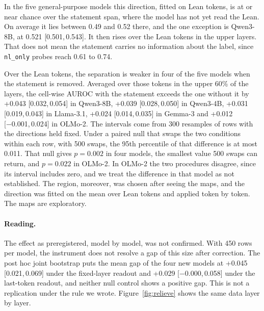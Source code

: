 \documentclass[10pt]{article}
\newcommand{\vr}[1]{\texttt{#1}}
\newcommand{\ic}[2]{[#1,\,#2]}
\begin{document}
In the five general-purpose models this direction, fitted on Lean tokens, is at or near chance over the statement
span, where the model has not yet read the Lean. On average it lies between 0.49 and 0.52 there, and the one
exception is Qwen3-8B, at 0.521 \ic{0.501}{0.543}. It then rises over the Lean tokens in the upper layers. That
does not mean the statement carries no information about the label, since \vr{nl\_only} probes reach 0.61 to 0.74.

Over the Lean tokens, the separation is weaker in four of the five models when the statement is removed. Averaged over those tokens in
the upper 60\% of the layers, the cell-wise AUROC with the statement exceeds the one without it by +0.043
\ic{0.032}{0.054} in Qwen3-8B, +0.039 \ic{0.028}{0.050} in Qwen3-4B, +0.031 \ic{0.019}{0.043} in Llama-3.1, +0.024
\ic{0.014}{0.035} in Gemma-3 and +0.012 \ic{−0.001}{0.024} in OLMo-2. The intervals come from 300 resamples of rows
with the directions held fixed. Under a paired null that swaps the two conditions within each row, with 500 swaps,
the 95th percentile of that difference is at most 0.011. That null gives $p = 0.002$ in four models, the smallest
value 500 swaps can return, and $p = 0.022$ in OLMo-2. In OLMo-2 the two procedures disagree, since its interval
includes zero, and we treat the difference in that model as not established. The region, moreover, was chosen after
seeing the maps, and the direction was fitted on the mean over Lean tokens and applied token by token. The maps are
exploratory.

\paragraph{Reading.}
The effect as preregistered, model by model, was not confirmed. With 450 rows per model, the instrument does not
resolve a gap of this size after correction. The post hoc joint bootstrap puts the mean gap of the four new models
at +0.045 \ic{0.021}{0.069} under the fixed-layer readout and +0.029 \ic{−0.000}{0.058} under the last-token
readout, and neither null control shows a positive gap. This is not a replication under the rule we wrote.
Figure~\ref{fig:relieve} shows the same data layer by layer.
\end{document}

